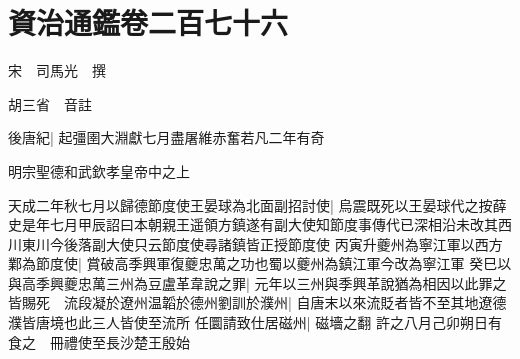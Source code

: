 \chapter{資治通鑑卷二百七十六}
宋　司馬光　撰

胡三省　音註

後唐紀|{
	起彊圉大淵獻七月盡屠維赤奮若凡二年有奇}


明宗聖德和武欽孝皇帝中之上

天成二年秋七月以歸德節度使王晏球為北面副招討使|{
	烏震既死以王晏球代之按薛史是年七月甲辰詔曰本朝親王遥領方鎮遂有副大使知節度事傳代已深相沿未改其西川東川今後落副大使只云節度使尋諸鎮皆正授節度使}
丙寅升夔州為寧江軍以西方鄴為節度使|{
	賞破高季興軍復夔忠萬之功也蜀以夔州為鎮江軍今改為寧江軍}
癸巳以與高季興夔忠萬三州為豆盧革韋說之罪|{
	元年以三州與季興革說猶為相因以此罪之}
皆賜死　流段凝於遼州温韜於德州劉訓於濮州|{
	自唐末以來流貶者皆不至其地遼德濮皆唐境也此三人皆使至流所}
任圜請致仕居磁州|{
	磁墻之翻}
許之八月己卯朔日有食之　冊禮使至長沙楚王殷始

